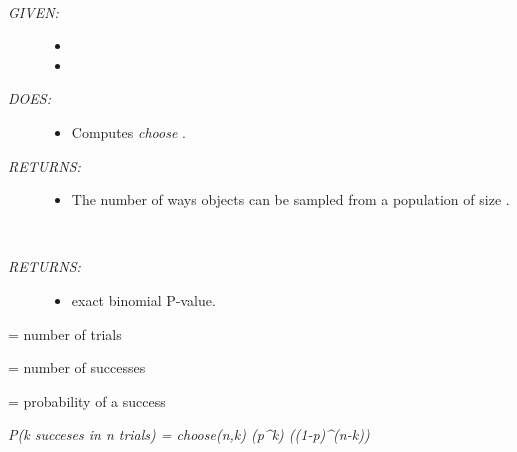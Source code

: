 \documentclass[letterpaper,10pt,english]{sphinxmanual}
\begin{document}
\begin{fulllineitems}
\label{code:gfunc.stats.binComb}~\begin{description}
\item[{\emph{GIVEN:}}] \leavevmode\begin{itemize}
\item {} 

\item {} 

\end{itemize}

\item[{\emph{DOES:}}] \leavevmode\begin{itemize}
\item {} 
Computes  \emph{choose} .

\end{itemize}

\item[{\emph{RETURNS:}}] \leavevmode\begin{itemize}
\item {} 
The number of ways  objects can be sampled from a population of size .

\end{itemize}

\end{description}

\end{fulllineitems}


\begin{fulllineitems}
\label{code:gfunc.stats.binomialPval}~\begin{description}
\item[{\emph{RETURNS:} }] \leavevmode\begin{itemize}
\item {} 
exact binomial P-value.

\end{itemize}

\end{description}

\begin{DUlineblock}{0em}
\item[]  = number of trials
\item[]  = number of successes
\item[]  = probability of a success
\item[] 
\item[] \emph{P(k succeses in n trials) = choose(n,k) (p\textasciicircum{}k) ((1-p)\textasciicircum{}(n-k))}
\end{DUlineblock}

\end{fulllineitems}
\end{document}
